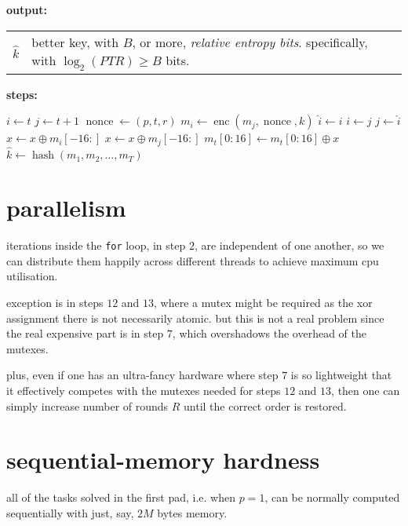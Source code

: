 \documentclass{article}
\DeclareMathOperator{\enc}{enc}
\DeclareMathOperator{\nonce}{nonce}
\DeclareMathOperator{\hash}{hash}
\begin{document}
\begin{multicols}{2}
\noindent\textbf{output:}

\begin{tabular}{lp{18em}}
$\hat k$ & better key, with $B$, or more, \emph{relative entropy bits}.
specifically, with $\log_2(PTR) \ge B$ bits.\\
\end{tabular}

\noindent\textbf{steps:}

\begin{algorithmic}[1]
            \STATE $i \leftarrow t$
            \STATE $j \leftarrow t+1$
                \STATE $\nonce \leftarrow (p, t, r)$
                \STATE $m_i \leftarrow \enc(m_j, \nonce, k)$
                \STATE $\hat i \leftarrow i$
                \STATE $i \leftarrow j$
                \STATE $j \leftarrow \hat i$
            \ENDFOR
            \STATE $x \leftarrow x \oplus m_i[-16:]$
            \STATE $x \leftarrow x \oplus m_j[-16:]$
        \ENDFOR
            \STATE $m_t[0:16] \leftarrow m_t[0:16] \oplus x$
        \ENDFOR
    \ENDFOR
    \RETURN $\hat k \leftarrow \hash(m_1, m_2, \ldots, m_T)$
\end{algorithmic}
\vfill\null
\columnbreak

\section{parallelism}
iterations inside the \texttt{for} loop, in step $2$, are independent of
one another, so we can distribute them happily across different threads to
achieve maximum cpu utilisation.

exception is in steps $12$ and $13$, where a mutex might be required as the
xor assignment there is not necessarily atomic.  but this is not a real
problem since the real expensive part is in step $7$, which overshadows the
overhead of the mutexes.

plus, even if one has an ultra-fancy hardware where step $7$ is so
lightweight that it effectively competes with the mutexes needed for steps
$12$ and $13$, then one can simply increase number of rounds $R$ until the
correct order is restored.

\section{sequential-memory hardness}
all of the tasks solved in the first pad, i.e. when $p=1$, can be normally
computed sequentially with just, say, $2M$ bytes memory.


\end{multicols}
\end{document}
